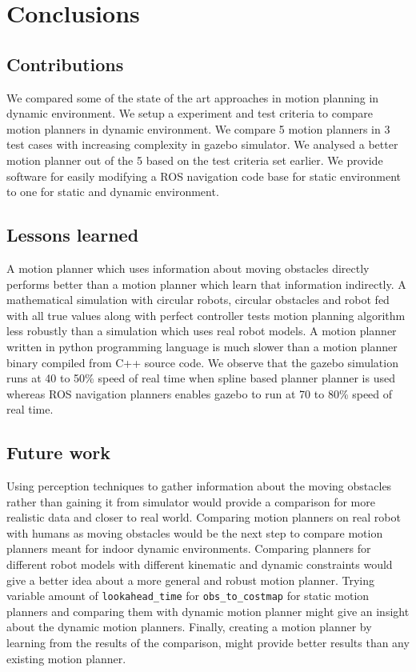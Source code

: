 
\chapter{Conclusions}

\section{Contributions}
\label{sec:contributions}
We compared some of the state of the art approaches in motion planning in dynamic environment.
We setup a experiment and test criteria to compare motion planners in dynamic environment.
We compare 5 motion planners in 3 test cases with increasing complexity in gazebo simulator.
We analysed a better motion planner out of the 5 based on the test criteria set earlier.
We provide software for easily modifying a ROS navigation code base for static environment to
one for static and dynamic environment.

\section{Lessons learned}
\label{sec:lessons_learned}
A motion planner which uses information about moving obstacles directly performs better
than a motion planner which learn that information indirectly. 
A mathematical simulation with circular robots, circular obstacles and robot fed with
all true values along with perfect controller tests motion planning
algorithm less robustly than a simulation which uses real robot models. 
A motion planner written in python programming language is much slower than a motion planner
binary compiled from C++ source code. We observe that the gazebo simulation runs at 40 to 50\% speed of real time
when spline based planner\cite{omgtools} planner is used whereas ROS navigation
planners\cite{dwa, tebLocalPlanner, eband}  enables gazebo
to run at 70 to 80\% speed of real time.

\section{Future work}
\label{sec:future_work}
Using perception techniques to gather information about the moving obstacles rather than
gaining it from simulator would provide a comparison for more realistic data and closer to real world.
Comparing motion planners on real robot with humans as moving obstacles would be the next step to 
compare motion planners meant for indoor dynamic environments.
Comparing planners for different robot models with different kinematic and dynamic constraints would
give a better idea about a more general and robust motion planner.
Trying variable amount of \texttt{lookahead\_time} for \texttt{obs\_to\_costmap} for static motion planners
and comparing them with dynamic motion planner might give an insight about the dynamic motion planners.
Finally, creating a motion planner by learning from the results of the comparison, might
provide better results than any existing motion planner.
